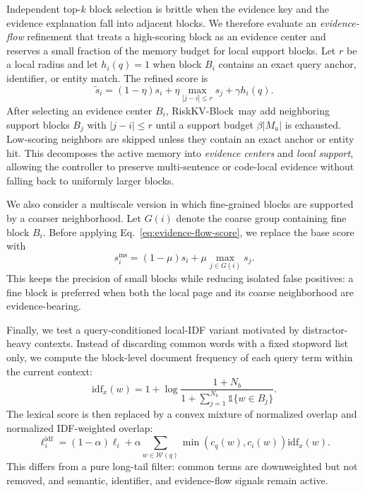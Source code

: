 \documentclass{article}
\newcommand{\method}{RiskKV-Block}
\begin{document}
Independent top-$k$ block selection is brittle when the evidence key and the evidence explanation fall into adjacent blocks.
We therefore evaluate an \emph{evidence-flow} refinement that treats a high-scoring block as an evidence center and reserves a small fraction of the memory budget for local support blocks.
Let $r$ be a local radius and let $h_i(q)=1$ when block $B_i$ contains an exact query anchor, identifier, or entity match.
The refined score is
\begin{equation}
    \tilde{s}_i
    =
    (1-\eta)s_i
    +
    \eta \max_{|j-i|\leq r} s_j
    +
    \gamma h_i(q).
    \label{eq:evidence-flow-score}
\end{equation}
After selecting an evidence center $B_i$, \method\ may add neighboring support blocks $B_j$ with $|j-i|\leq r$ until a support budget $\beta |M_a|$ is exhausted.
Low-scoring neighbors are skipped unless they contain an exact anchor or entity hit.
This decomposes the active memory into \emph{evidence centers} and \emph{local support}, allowing the controller to preserve multi-sentence or code-local evidence without falling back to uniformly larger blocks.

We also consider a multiscale version in which fine-grained blocks are supported by a coarser neighborhood.
Let $G(i)$ denote the coarse group containing fine block $B_i$.
Before applying Eq.~\ref{eq:evidence-flow-score}, we replace the base score with
\begin{equation}
    s_i^{\mathrm{ms}}
    =
    (1-\mu)s_i
    +
    \mu \max_{j\in G(i)} s_j.
    \label{eq:multiscale-flow-score}
\end{equation}
This keeps the precision of small blocks while reducing isolated false positives: a fine block is preferred when both the local page and its coarse neighborhood are evidence-bearing.

Finally, we test a query-conditioned local-IDF variant motivated by distractor-heavy contexts.
Instead of discarding common words with a fixed stopword list only, we compute the block-level document frequency of each query term within the current context:
\begin{equation}
    \mathrm{idf}_x(w)
    =
    1+\log\frac{1+N_b}{1+\sum_{j=1}^{N_b}\mathbb{1}\{w\in B_j\}}.
\end{equation}
The lexical score is then replaced by a convex mixture of normalized overlap and normalized IDF-weighted overlap:
\begin{equation}
    \ell_i^{\mathrm{idf}}
    =
    (1-\alpha)\ell_i
    +
    \alpha
    \sum_{w\in \mathcal{W}(q)}
    \min(c_q(w),c_i(w))\mathrm{idf}_x(w).
    \label{eq:local-idf-score}
\end{equation}
This differs from a pure long-tail filter: common terms are downweighted but not removed, and semantic, identifier, and evidence-flow signals remain active.
\end{document}
